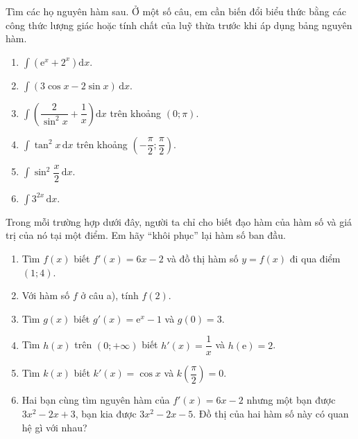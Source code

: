 \begin{bai}Tìm các họ nguyên hàm sau. Ở một số câu, em cần biến đổi biểu thức bằng các công thức lượng giác hoặc tính chất của luỹ thừa trước khi áp dụng bảng nguyên hàm.
\begin{enumerate}[label=\alph*)]
\item $\displaystyle\int\left(\mathrm e^x+2^x\right)\mathrm dx$.
\item $\displaystyle\int(3\cos x-2\sin x)\,\mathrm dx$.
\item $\displaystyle\int\left(\dfrac2{\sin^2x}+\dfrac1x\right)\mathrm dx$ trên khoảng $(0;\pi)$.
\item $\displaystyle\int\tan^2x\,\mathrm dx$ trên khoảng $\left(-\dfrac\pi2;\dfrac\pi2\right)$.
\item $\displaystyle\int\sin^2\dfrac x2\,\mathrm dx$.
\item $\displaystyle\int3^{2x}\,\mathrm dx$.
\end{enumerate}
\end{bai}

\begin{bai}Trong mỗi trường hợp dưới đây, người ta chỉ cho biết đạo hàm của hàm số và giá trị của nó tại một điểm. Em hãy “khôi phục” lại hàm số ban đầu.
\begin{enumerate}[label=\alph*)]
\item Tìm $f(x)$ biết $f'(x)=6x-2$ và đồ thị hàm số $y=f(x)$ đi qua điểm $(1;4)$.
\item Với hàm số $f$ ở câu a), tính $f(2)$.
\item Tìm $g(x)$ biết $g'(x)=\mathrm e^x-1$ và $g(0)=3$.
\item Tìm $h(x)$ trên $(0;+\infty)$ biết $h'(x)=\dfrac1x$ và $h(\mathrm e)=2$.
\item Tìm $k(x)$ biết $k'(x)=\cos x$ và $k\left(\dfrac\pi2\right)=0$.
\item Hai bạn cùng tìm nguyên hàm của $f'(x)=6x-2$ nhưng một bạn được $3x^2-2x+3$, bạn kia được $3x^2-2x-5$. Đồ thị của hai hàm số này có quan hệ gì với nhau?
\end{enumerate}
\end{bai}

